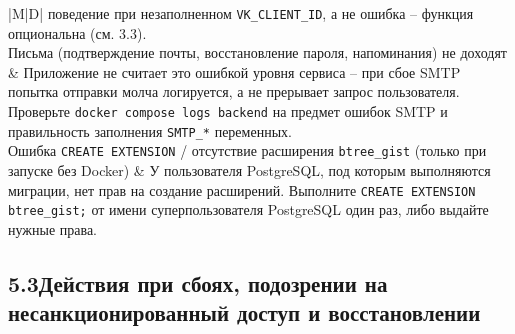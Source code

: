 \begin{xltabular}{\textwidth}{|M|D|}
  поведение при незаполненном \texttt{VK\_CLIENT\_ID}, а не ошибка --
  функция опциональна (см. 3.3). \\
\hline
Письма (подтверждение почты, восстановление пароля, напоминания) не
  доходят & Приложение не считает это ошибкой уровня сервиса -- при
  сбое SMTP попытка отправки молча логируется, а не прерывает запрос
  пользователя. Проверьте \texttt{docker compose logs backend} на
  предмет ошибок SMTP и правильность заполнения \texttt{SMTP\_*}
  переменных. \\
\hline
Ошибка \texttt{CREATE EXTENSION} / отсутствие расширения
  \texttt{btree\_gist} (только при запуске без Docker) & У
  пользователя PostgreSQL, под которым выполняются миграции, нет прав
  на создание расширений. Выполните \texttt{CREATE EXTENSION
  btree\_gist;} от имени суперпользователя PostgreSQL один раз, либо
  выдайте нужные права. \\\hline
\end{xltabular}

\subsection*{\hspace*{\gostindent}5.3\quad Действия при сбоях, подозрении на несанкционированный доступ и восстановлении}

